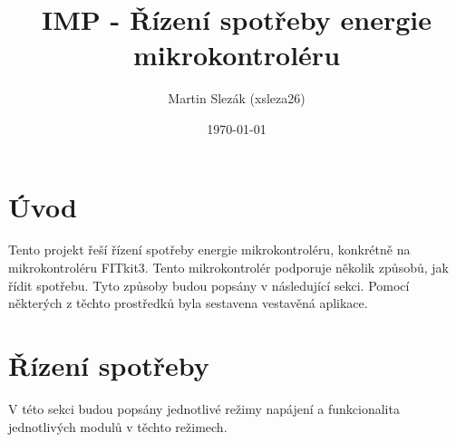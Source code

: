 \documentclass{article}
\title{IMP - Řízení spotřeby energie mikrokontroléru}
\author{Martin Slezák (xsleza26)}
\date{\today}
\begin{document}
\maketitle

\section{Úvod}

Tento projekt řeší řízení spotřeby energie mikrokontroléru, konkrétně na
mikrokontroléru FITkit3. Tento mikrokontrolér podporuje několik způsobů, jak
řídit spotřebu. Tyto způsoby budou popsány v následující sekci. Pomocí
některých z těchto prostředků byla sestavena vestavěná aplikace.

\section{Řízení spotřeby}

V této sekci budou popsány jednotlivé režimy napájení a funkcionalita
jednotlivých modulů v těchto režimech.
\end{document}
